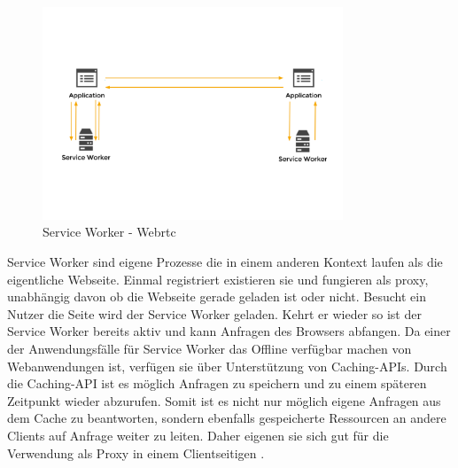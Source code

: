 \begin{figure}[!h]
	\centering
	\includegraphics[width=0.8\textwidth]{figures/service_worker_app}
	\caption[A Figure Short-Title]{Service Worker - Webrtc}
	\label{fig:mesh}
\end{figure}

Service Worker sind eigene Prozesse die in einem anderen Kontext laufen als die eigentliche Webseite. Einmal registriert existieren sie und fungieren als proxy, unabhängig davon ob die Webseite gerade geladen ist oder nicht. Besucht ein Nutzer die Seite wird der Service Worker geladen. Kehrt er wieder so ist der Service Worker bereits aktiv und kann Anfragen des Browsers abfangen. Da einer der Anwendungsfälle für Service Worker das Offline verfügbar machen von Webanwendungen ist, verfügen sie über Unterstützung von Caching-APIs. Durch die Caching-API ist es möglich Anfragen zu speichern und zu einem späteren Zeitpunkt wieder abzurufen. Somit ist es nicht nur möglich eigene Anfragen aus dem Cache zu beantworten, sondern ebenfalls gespeicherte Ressourcen an andere Clients auf Anfrage weiter zu leiten. Daher eigenen sie sich gut für die Verwendung als Proxy in einem Clientseitigen \cdn.   

